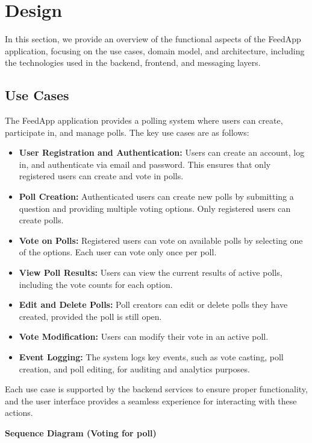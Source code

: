 \section{Design}
\label{sec:design}

\noindent
In this section, we provide an overview of the functional aspects of the FeedApp application, focusing on the use cases, domain model, and architecture, including the technologies used in the backend, frontend, and messaging layers.

\subsection{Use Cases}
The FeedApp application provides a polling system where users can create, participate in, and manage polls. The key use cases are as follows:
\begin{itemize}
    \item \textbf{User Registration and Authentication:} Users can create an account, log in, and authenticate via email and password. This ensures that only registered users can create and vote in polls.
    \item \textbf{Poll Creation:} Authenticated users can create new polls by submitting a question and providing multiple voting options. Only registered users can create polls.
    \item \textbf{Vote on Polls:} Registered users can vote on available polls by selecting one of the options. Each user can vote only once per poll.
    \item \textbf{View Poll Results:} Users can view the current results of active polls, including the vote counts for each option.
    \item \textbf{Edit and Delete Polls:} Poll creators can edit or delete polls they have created, provided the poll is still open.
    \item \textbf{Vote Modification:} Users can modify their vote in an active poll.
    \item \textbf{Event Logging:} The system logs key events, such as vote casting, poll creation, and poll editing, for auditing and analytics purposes.
\end{itemize}
Each use case is supported by the backend services to ensure proper functionality, and the user interface provides a seamless experience for interacting with these actions.

\vspace{1cm}

\noindent \textbf{Sequence Diagram (Voting for poll)}


